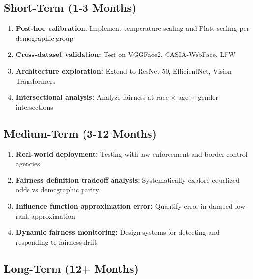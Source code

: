 \documentclass[11pt,a4paper,oneside]{report}
\begin{document}
\subsection{Short-Term (1-3 Months)}

\begin{enumerate}

\item \textbf{Post-hoc calibration:} Implement temperature scaling and Platt scaling per demographic group

\item \textbf{Cross-dataset validation:} Test on VGGFace2, CASIA-WebFace, LFW

\item \textbf{Architecture exploration:} Extend to ResNet-50, EfficientNet, Vision Transformers

\item \textbf{Intersectional analysis:} Analyze fairness at race $\times$ age $\times$ gender intersections

\end{enumerate}

\subsection{Medium-Term (3-12 Months)}

\begin{enumerate}

\item \textbf{Real-world deployment:} Testing with law enforcement and border control agencies

\item \textbf{Fairness definition tradeoff analysis:} Systematically explore equalized odds vs demographic parity

\item \textbf{Influence function approximation error:} Quantify error in damped low-rank approximation

\item \textbf{Dynamic fairness monitoring:} Design systems for detecting and responding to fairness drift

\end{enumerate}

\subsection{Long-Term (12+ Months)}
\end{document}
